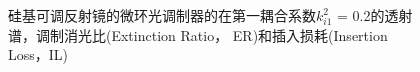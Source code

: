 \begin{figure}[htb]
{\begin{minipage}[]{0.5\textwidth}
		\end{minipage}}		
	\caption{硅基可调反射镜的微环光调制器的在第一耦合系数$k_{i1}^2$ = 0.2的透射谱，调制消光比(Extinction Ratio， ER)和插入损耗(Insertion Loss，IL)}
	\label{chapt5_reflactor_modulator_k1_modulator}	
\end{figure}

